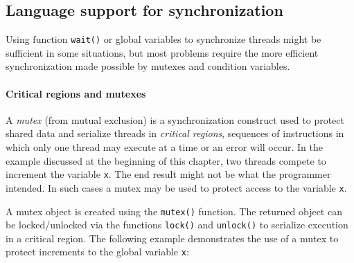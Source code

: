 \subsection*{Language support for synchronization}

Using function \texttt{wait()} or global variables to synchronize threads might
be sufficient in some situations, but most problems require the more efficient
synchronization made possible by mutexes and condition variables.

\paragraph{Critical regions and mutexes}

A \emph{mutex} (from mutual exclusion) is a synchronization construct
used to protect shared data and serialize threads in \emph{critical
regions}, sequences of instructions in which only one thread may
execute at a time or an error will occur. In the example discussed at
the beginning of this chapter, two threads compete to increment the
variable \texttt{x}. The end result might not be what the programmer
intended. In such cases a mutex may be used to protect access to the
variable \texttt{x}.

A mutex object is created using the \texttt{mutex()} function. The returned
object can be locked/unlocked via the functions \texttt{lock()} and
\texttt{unlock()} to serialize execution in a critical region. The following
example demonstrates the use of a mutex to protect increments to the global
variable \texttt{x}:


